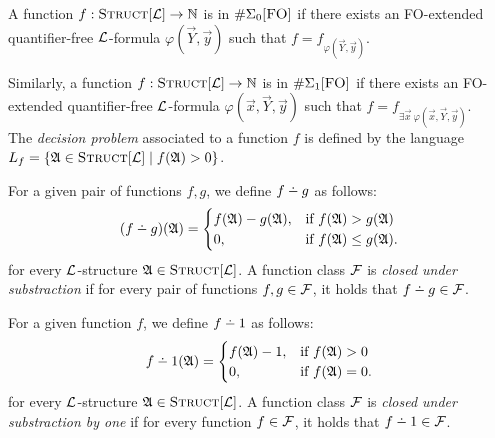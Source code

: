 \documentclass[12pt]{article}
\def\dotminus{\mathbin{\ooalign{\hss\raise1ex\hbox{.}\hss\cr
  \mathsurround=0pt$-$}}}
\def\Eo{\#\Sigma_0[\mbox{{\sc FO}}]}
\def\E1{\#\Sigma_1[\mbox{{\sc FO}}]}
\def\Truc{\textsc{Struct}[\L]}
\def\A{{\frak A}}
\def\F{{\cal F}}
\def\L{{\cal L}}
\def\N{\mathbb{N}}
\def\Y{\vec{Y}}
\def\x{\vec{x}} %
\def\y{\vec{y}} %
\begin{document}
A function $f:\Truc \to \N$ is in $\Eo$ if there exists an {\sc FO}-extended quantifier-free $\L$-formula $\varphi(\Y,\y)$ such that $f = f_{\varphi(\Y,\y)}.$

Similarly, a function $f:\Truc \to \N$ is in $\E1$ if there exists an {\sc FO}-extended quantifier-free $\L$-formula $\varphi(\x,\Y,\y)$ such that $f = f_{\exists \x \: \varphi(\x,\Y,\y)}.$\\



The {\em decision problem} associated to a function $f$ is defined by the language $L_f = \{\A \in \Truc \mid f(\A) > 0\}$.



For a given pair of functions $f,g$, we define $f \dotminus g$ as follows:
\begin{eqnarray*}
(f \dotminus g)(\A) =
\begin{cases}
f(\A)-g(\A), & \text{if }f(\A)>g(\A) \\
0, & \text{if }f(\A) \leq g(\A).
\end{cases}
\end{eqnarray*}
for every $\L$-structure $\A \in \Truc$. A function class $\F$ is {\em closed under substraction} if for every pair of functions $f,g \in \F$, it holds that $f \dotminus g \in \F$.





For a given function $f$, we define $f \dotminus 1$ as follows:
\begin{eqnarray*}
f \dotminus 1(\A) =
\begin{cases}
f(\A)-1, & \text{if }f(\A) > 0 \\
0, & \text{if }f(\A) = 0.
\end{cases}
\end{eqnarray*}
for every $\L$-structure $\A \in \Truc$. A function class $\F$ is {\em closed under substraction by one} if for every function $f \in \F$, it holds that $f \dotminus 1 \in \F$.





\end{document}
